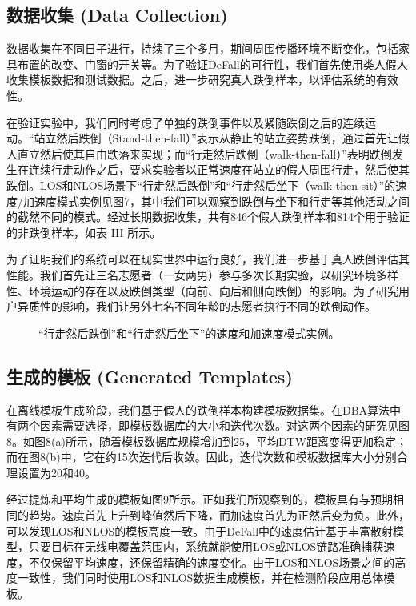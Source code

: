 \documentclass[journal]{IEEEtran}
\begin{document}
\subsection{数据收集 (Data Collection)}
数据收集在不同日子进行，持续了三个多月，期间周围传播环境不断变化，包括家具布置的改变、门窗的开关等。为了验证DeFall的可行性，我们首先使用类人假人收集模板数据和测试数据。之后，进一步研究真人跌倒样本，以评估系统的有效性。

在验证实验中，我们同时考虑了单独的跌倒事件以及紧随跌倒之后的连续运动。“站立然后跌倒（Stand-then-fall）”表示从静止的站立姿势跌倒，通过首先让假人直立然后使其自由跌落来实现；而“行走然后跌倒（walk-then-fall）”表明跌倒发生在连续行走动作之后，要求实验者以正常速度在站立的假人周围行走，然后使其跌倒。LOS和NLOS场景下“行走然后跌倒”和“行走然后坐下（walk-then-sit）”的速度/加速度模式实例见图7，其中我们可以观察到跌倒与坐下和行走等其他活动之间的截然不同的模式。经过长期数据收集，共有846个假人跌倒样本和814个用于验证的非跌倒样本，如表 III 所示。

为了证明我们的系统可以在现实世界中运行良好，我们进一步基于真人跌倒评估其性能。我们首先让三名志愿者（一女两男）参与多次长期实验，以研究环境多样性、环境运动的存在以及跌倒类型（向前、向后和侧向跌倒）的影响。为了研究用户异质性的影响，我们让另外七名不同年龄的志愿者执行不同的跌倒动作。

\begin{figure}[htbp]
\centering
\vspace{6cm} %
\caption{“行走然后跌倒”和“行走然后坐下”的速度和加速度模式实例。}
\end{figure}

\subsection{生成的模板 (Generated Templates)}
在离线模板生成阶段，我们基于假人的跌倒样本构建模板数据集。在DBA算法中有两个因素需要选择，即模板数据库的大小和迭代次数。对这两个因素的研究见图8。如图8(a)所示，随着模板数据库规模增加到25，平均DTW距离变得更加稳定；而在图8(b)中，它在约15次迭代后收敛。因此，迭代次数和模板数据库大小分别合理设置为20和40。

经过提炼和平均生成的模板如图9所示。正如我们所观察到的，模板具有与预期相同的趋势。速度首先上升到峰值然后下降，而加速度首先为正然后变为负。此外，可以发现LOS和NLOS的模板高度一致。由于DeFall中的速度估计基于丰富散射模型，只要目标在无线电覆盖范围内，系统就能使用LOS或NLOS链路准确捕获速度，不仅保留平均速度，还保留精确的速度变化。由于LOS和NLOS场景之间的高度一致性，我们同时使用LOS和NLOS数据生成模板，并在检测阶段应用总体模板。
\end{document}
